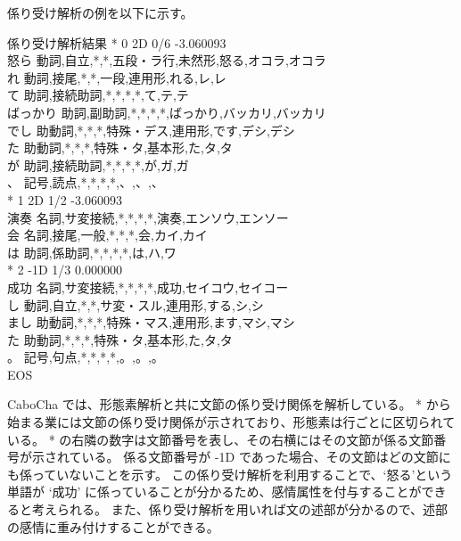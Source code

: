 \documentclass[11pt,a4j]{jsarticle}
\begin{document}
係り受け解析の例を以下に示す。

\begin{itembox}[l]{係り受け解析結果}
  * 0 2D 0/6 -3.060093 \\
  怒ら  動詞,自立,*,*,五段・ラ行,未然形,怒る,オコラ,オコラ \\
  れ  動詞,接尾,*,*,一段,連用形,れる,レ,レ\\
  て  助詞,接続助詞,*,*,*,*,て,テ,テ\\
  ばっかり  助詞,副助詞,*,*,*,*,ばっかり,バッカリ,バッカリ\\
  でし  助動詞,*,*,*,特殊・デス,連用形,です,デシ,デシ\\
  た  助動詞,*,*,*,特殊・タ,基本形,た,タ,タ\\
  が  助詞,接続助詞,*,*,*,*,が,ガ,ガ\\
  、  記号,読点,*,*,*,*,、,、,、\\
  * 1 2D 1/2 -3.060093\\
  演奏  名詞,サ変接続,*,*,*,*,演奏,エンソウ,エンソー\\
  会  名詞,接尾,一般,*,*,*,会,カイ,カイ\\
  は  助詞,係助詞,*,*,*,*,は,ハ,ワ\\
  * 2 -1D 1/3 0.000000\\
  成功  名詞,サ変接続,*,*,*,*,成功,セイコウ,セイコー\\
  し  動詞,自立,*,*,サ変・スル,連用形,する,シ,シ\\
  まし  助動詞,*,*,*,特殊・マス,連用形,ます,マシ,マシ\\
  た  助動詞,*,*,*,特殊・タ,基本形,た,タ,タ\\
  。  記号,句点,*,*,*,*,。,。,。\\
  EOS
\end{itembox}

CaboCha では、形態素解析と共に文節の係り受け関係を解析している。
* から始まる業には文節の係り受け関係が示されており、形態素は行ごとに区切られている。
* の右隣の数字は文節番号を表し、その右横にはその文節が係る文節番号が示されている。
係る文節番号が -1D であった場合、その文節はどの文節にも係っていないことを示す。
この係り受け解析を利用することで、`怒る'という単語が `成功' に係っていることが分かるため、感情属性を付与することができると考えられる。
また、係り受け解析を用いれば文の述部が分かるので、述部の感情に重み付けすることができる。
\end{document}
